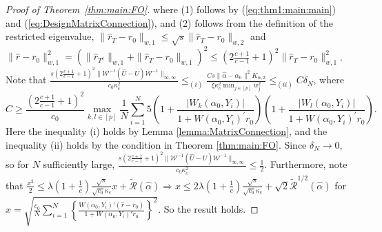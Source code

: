\documentclass[11pt]{article}
\begin{document}
\begin{proof}[Proof of Theorem~\ref{thm:main:FO}]
where (1) follows by (\ref{eq:thm1:main:main}) and (\ref{eq:DesignMatrixConnection}),  and (2) follows from the definition of the restricted eigenvalue, $\|\hat{r}_{T}-r_0\|_{w,1}\leq\sqrt{s}\|\hat{r}_{T}-r_0\|_{w,2}$ and $\|\hat{r}-r_0\|_{w,1}^2=(\|\hat{r}_{T^c}\|_{w,1}+\|\hat{r}_T-r_0\|_{w,1})^2\leq\left(2\frac{c+1}{c-1}+1\right)^2\|\hat{r}_T-r_0\|_{w,1}^2$. Note that $\frac{s\left(2\frac{c+1}{c-1}+1\right)^2\|\mathcal{W}^{-1}(\hat U - U)\mathcal{W}^{-1} \|_{\infty,\infty} }{c_0\kappa_{\bar{c}}^2} \leq_{(i)} \frac{Cs\|\hat\alpha-\alpha_0\|^2 K_{\alpha,2}}{\xi\kappa_{\bar c}^2 \min_{j\in[p]} w_j^2}\leq_{(ii)}C\delta_N$, where $$C\geq\frac{\left(2\frac{c+1}{c-1}+1\right)^2}{c_0}\max_{k,l\in[p]}\frac{1}{N}\sum_{i=1}^N5\left(1+\frac{|W_k(\alpha_0,Y_i)|}{1+W(\alpha_0,Y_i)^\prime r_0}\right)\left(1+\frac{|W_l(\alpha_0,Y_i)|}{1+W(\alpha_0,Y_i)^\prime r_0}\right).$$
Here the inequality (i) holds by Lemma \ref{lemma:MatrixConnection}, and the inequality (ii) holds by the condition in Theorem \ref{thm:main:FO}. Since $\delta_N\rightarrow0$, so for $N$ sufficiently large, $\frac{s \left(2\frac{c+1}{c-1}+1\right)^2\|\mathcal{W}^{-1}(\hat U - U)\mathcal{W}^{-1} \|_{\infty,\infty} }{c_0\kappa_{\bar{c}}^2} \leq \frac{1}{2}$.
Furthermore, note that 
$\frac{x^2}{2} \leq \lambda(1+\frac{1}{c})\frac{\sqrt{s}}{\sqrt{c_0}\kappa_{\bar{c}}} x + \widetilde{\mathcal{R}}(\hat \alpha) \Rightarrow x \leq 2\lambda(1+\frac{1}{c})\frac{\sqrt{s}}{\sqrt{c_0}\kappa_{\bar{c}}} + \sqrt{2}\widetilde{\mathcal{R}}^{1/2}(\hat \alpha)$ for $x=\sqrt{\frac{c_0}{N}\sum_{i=1}^N\left\{\frac{W(\alpha_0,Y_i)'(\hat{r}-r_0)}{1+W(\alpha_0,Y_i)'r_0}\right\}^2}$.
So the result holds. 
\end{proof}
\medskip
\end{document}

